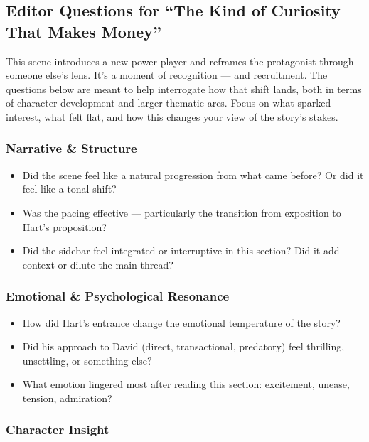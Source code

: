 \subsection*{Editor Questions for ``The Kind of Curiosity That Makes Money''}

This scene introduces a new power player and reframes the protagonist through someone else’s lens. It’s a moment of recognition — and recruitment. The questions below are meant to help interrogate how that shift lands, both in terms of character development and larger thematic arcs. Focus on what sparked interest, what felt flat, and how this changes your view of the story’s stakes.

\subsubsection*{Narrative \& Structure}

\begin{itemize}
  \item Did the scene feel like a natural progression from what came before? Or did it feel like a tonal shift?
  \item Was the pacing effective — particularly the transition from exposition to Hart’s proposition?
  \item Did the sidebar feel integrated or interruptive in this section? Did it add context or dilute the main thread?
\end{itemize}

\subsubsection*{Emotional \& Psychological Resonance}

\begin{itemize}
  \item How did Hart’s entrance change the emotional temperature of the story?
  \item Did his approach to David (direct, transactional, predatory) feel thrilling, unsettling, or something else?
  \item What emotion lingered most after reading this section: excitement, unease, tension, admiration?
\end{itemize}

\subsubsection*{Character Insight}

